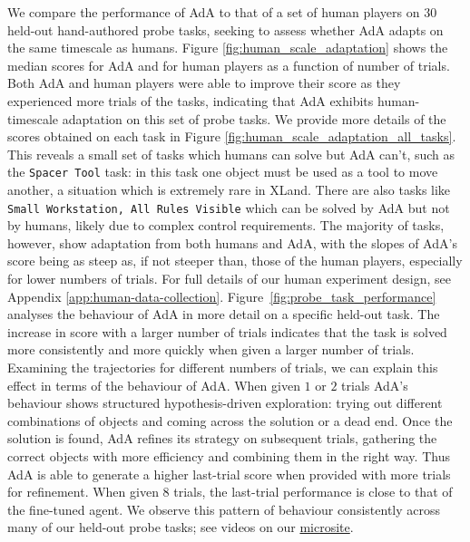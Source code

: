 \documentclass[11pt, a4paper, logo, copyright]{deepmind}
\begin{document}
We compare the performance of AdA to that of a set of human players on $30$ held-out hand-authored probe tasks, seeking to assess whether AdA adapts on the same timescale as humans. Figure \ref{fig:human_scale_adaptation} shows the median scores for AdA and for human players as a function of number of trials. Both AdA and human players were able to improve their score as they experienced more trials of the tasks, indicating that AdA exhibits human-timescale adaptation on this set of probe tasks. We provide more details of the scores obtained on each task in Figure \ref{fig:human_scale_adaptation_all_tasks}. This reveals a small set of tasks which humans can solve but AdA can't, such as the \texttt{Spacer Tool} task: in this task one object must be used as a tool to move another, a situation which is extremely rare in XLand. There are also tasks like \texttt{Small Workstation, All Rules Visible} which can be solved by AdA but not by humans, likely due to complex control requirements. The majority of tasks, however, show adaptation from both humans and AdA, with the slopes of AdA's score being as steep as, if not steeper than, those of the human players, especially for lower numbers of trials. For full details of our human experiment design, see Appendix \ref{app:human-data-collection}.
Figure~\ref{fig:probe_task_performance} analyses the behaviour of AdA in more detail on a specific held-out task. The increase in score with a larger number of trials indicates that the task is solved more consistently and more quickly when given a larger number of trials. Examining the trajectories for different numbers of trials, we can explain this effect in terms of the behaviour of AdA. When given $1$ or $2$ trials AdA's behaviour shows structured hypothesis-driven exploration: trying out different combinations of objects and coming across the solution or a dead end. Once the solution is found, AdA refines its strategy on subsequent trials, gathering the correct objects with more efficiency and combining them in the right way. Thus AdA is able to generate a higher last-trial score when provided with more trials for refinement. When given $8$ trials, the last-trial performance is close to that of the fine-tuned agent. We observe this pattern of behaviour consistently across many of our held-out probe tasks; see videos on our \href{http://sites.google.com/view/adaptive-agent/}{microsite}.
\end{document}
